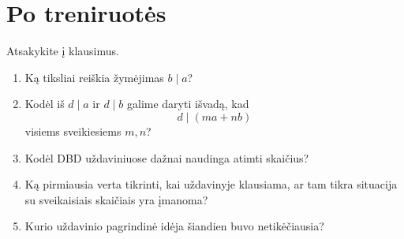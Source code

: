 \documentclass[11pt,a4paper]{scrartcl}
\begin{document}
\section*{Po treniruotės}

Atsakykite į klausimus.

\begin{enumerate}
    \renewcommand{\labelenumi}{\textbf{\theenumi.}}

    \item Ką tiksliai reiškia žymėjimas $b\mid a$?

    \item Kodėl iš $d\mid a$ ir $d\mid b$ galime daryti išvadą, kad
    \[
    d\mid(ma+nb)
    \]
    visiems sveikiesiems $m,n$?

    \item Kodėl DBD uždaviniuose dažnai naudinga atimti skaičius?

    \item Ką pirmiausia verta tikrinti, kai uždavinyje klausiama, ar tam tikra
    situacija su sveikaisiais skaičiais yra įmanoma?

    \item Kurio uždavinio pagrindinė idėja šiandien buvo netikėčiausia?
\end{enumerate}
\end{document}
